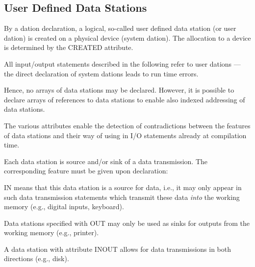

\subsection{User Defined Data Stations}    %

By a dation declaration, a logical, so-called user defined data station
(or user dation) is created on a physical device (system dation). The
allocation to a device is determined by the CREATED attribute.

All input/output statements described in the following refer to user
dations --- the direct declaration of system dations leads to run time
errors.



Hence, no arrays of data stations may be declared. However, it is
possible to declare arrays of references to data stations to enable also
indexed addressing of data stations.

The various attributes enable the detection of contradictions between
the features of data stations and their way of using in I/O statements
already at compilation time.



Each data station is source and/or sink of a data transmission. The
corresponding feature must be given upon declaration:



IN means that this data station is a source for data, i.e., it may only
appear in such data transmission statements which transmit these data
{\em into} the working memory (e.g., digital inputs, keyboard).

Data stations specified with OUT may only be used as sinks for outputs
from the working memory (e.g., printer).

A data station with attribute INOUT allows for data transmissions in
both directions (e.g., disk).


